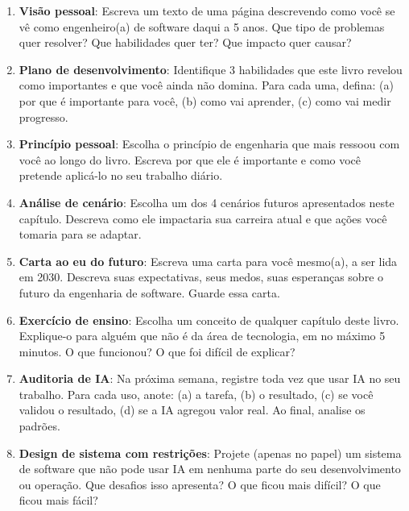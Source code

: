 \begin{enumerate}
    \item \textbf{Visão pessoal}: Escreva um texto de uma página descrevendo como
    você se vê como engenheiro(a) de software daqui a 5 anos. Que tipo de
    problemas quer resolver? Que habilidades quer ter? Que impacto quer causar?

    \item \textbf{Plano de desenvolvimento}: Identifique 3 habilidades que este livro
    revelou como importantes e que você ainda não domina. Para cada uma, defina:
    (a) por que é importante para você, (b) como vai aprender, (c) como vai
    medir progresso.

    \item \textbf{Princípio pessoal}: Escolha o princípio de engenharia que mais
    ressoou com você ao longo do livro. Escreva por que ele é importante e
    como você pretende aplicá-lo no seu trabalho diário.

    \item \textbf{Análise de cenário}: Escolha um dos 4 cenários futuros apresentados
    neste capítulo. Descreva como ele impactaria sua carreira atual e que
    ações você tomaria para se adaptar.

    \item \textbf{Carta ao eu do futuro}: Escreva uma carta para você mesmo(a), a
    ser lida em 2030. Descreva suas expectativas, seus medos, suas esperanças
    sobre o futuro da engenharia de software. Guarde essa carta.

    \item \textbf{Exercício de ensino}: Escolha um conceito de qualquer capítulo
    deste livro. Explique-o para alguém que não é da área de tecnologia, em
    no máximo 5 minutos. O que funcionou? O que foi difícil de explicar?

    \item \textbf{Auditoria de IA}: Na próxima semana, registre toda vez que usar
    IA no seu trabalho. Para cada uso, anote: (a) a tarefa, (b) o resultado,
    (c) se você validou o resultado, (d) se a IA agregou valor real.
    Ao final, analise os padrões.

    \item \textbf{Design de sistema com restrições}: Projete (apenas no papel) um
    sistema de software que não pode usar IA em nenhuma parte do seu
    desenvolvimento ou operação. Que desafios isso apresenta? O que ficou mais
    difícil? O que ficou mais fácil?
\end{enumerate}


